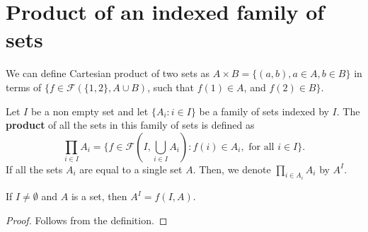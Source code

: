 \documentclass[a4paper,english,12pt]{article}   	%
\begin{document}
\section{Product of an indexed family of sets}
We can define Cartesian product of two sets as $A \times B = \{(a,b), a \in A , b\in B\}$ in terms of $\{f\in \mathcal{F}(\{1,2\}, A \cup B)$, such that $f(1) \in A$, and $f(2)\in B\}$.
\begin{defn}
Let $I$ be a non empty set and let $\{ A_i : i \in I \}$ be a family of sets indexed by $I$. The \textbf{product} of all the sets in this family of sets is defined as 
\begin{equation*}
\prod_{i\in I} A_i = \{ f \in \mathcal{F}(I,\bigcup_{i \in I}A_i) : f(i) \in A_i, \text{ for all }i \in I\}.
\end{equation*}
If all the sets $A_i$ are equal to a single set $A$. Then, we denote $\prod_{i \in A_i}A_i$ by $A^I$.
\end{defn}
\begin{prop} If $I \neq \emptyset$ and $A$ is a set, then $A^I = f(I,A)$.
\end{prop}
\begin{proof} Follows from the definition.
\end{proof}
\end{document}
